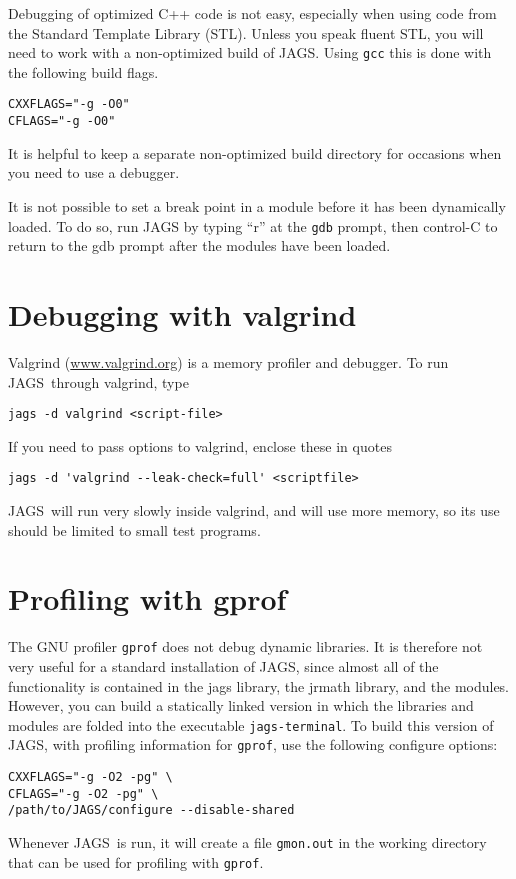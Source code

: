 \documentclass[11pt, a4paper, titlepage]{report}
\newcommand{\JAGS}{\textsf{JAGS}}
\begin{document}
Debugging of optimized C++ code is not easy, especially when using
code from the Standard Template Library (STL).  Unless you speak
fluent STL, you will need to work with a non-optimized build of
\JAGS. Using \verb+gcc+ this is done with the following build flags.
\begin{verbatim}
CXXFLAGS="-g -O0"
CFLAGS="-g -O0"
\end{verbatim}
It is helpful to keep a separate non-optimized build directory for
occasions when you need to use a debugger.

It is not possible to set a break point in a module before it has
been dynamically loaded. To do so, run JAGS by typing ``r'' at the
\verb+gdb+ prompt, then control-C to return to the gdb prompt after
the modules have been loaded.

\section{Debugging with valgrind}

Valgrind (\url{www.valgrind.org}) is a memory profiler and
debugger. To run \JAGS\ through valgrind, type
\begin{verbatim}
jags -d valgrind <script-file>
\end{verbatim}
If you need to pass options to valgrind, enclose these in quotes
\begin{verbatim}
jags -d 'valgrind --leak-check=full' <scriptfile>
\end{verbatim}
\JAGS\ will run very slowly inside valgrind, and will use more memory,
so its use should be limited to small test programs.

\section{Profiling with gprof}

The GNU profiler \texttt{gprof} does not debug dynamic libraries. It
is therefore not very useful for a standard installation of \JAGS,
since almost all of the functionality is contained in the jags
library, the jrmath library, and the modules.  However, you can build
a statically linked version in which the libraries and modules are
folded into the executable \texttt{jags-terminal}. To build this
version of \JAGS, with profiling information for \texttt{gprof}, use
the following configure options:
\begin{verbatim}
CXXFLAGS="-g -O2 -pg" \
CFLAGS="-g -O2 -pg" \
/path/to/JAGS/configure --disable-shared
\end{verbatim}
Whenever \JAGS\ is run, it will create a file \texttt{gmon.out} in
the working directory that can be used for profiling with \texttt{gprof}.
\end{document}
